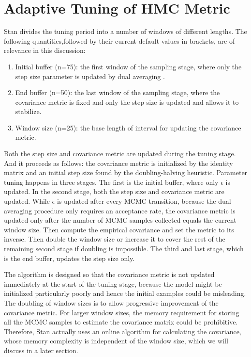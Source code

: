 \documentclass[12pt]{report}
\begin{document}
\section{Adaptive Tuning of HMC Metric}
Stan divides the tuning period into a number of windows of different lengths. The following quantities,followed by their current default values in brackets, are of relevance in this discussion: 

\begin{enumerate}
\item Initial buffer (n=75): the first window of the sampling stage, where only the step size parameter is updated by dual averaging .

\item End buffer (n=50): the last window of the sampling stage, where the covariance metric is fixed and only the step size is updated and allows it to stabilize.

\item Window size (n=25): the base length of interval for updating the covariance metric. 
\end{enumerate}

Both the step size and covariance metric are updated during the tuning stage. And it proceeds as follows: the covariance metric is initialized by the identity matrix and an initial step size found by the doubling-halving heuristic. Parameter tuning happens in three stages. The first is the initial buffer, where only $\epsilon $ is updated. In the second stage, both the step size and covariance metric are updated. While $\epsilon$ is updated after every MCMC transition, because the dual averaging procedure only requires an acceptance rate, the covariance metric is updated only after the number of MCMC samples collected equals the current window size. Then compute the empirical covariance and set the metric to its inverse. Then double the window size or increase it to cover the rest of the remaining second stage if doubling is impossible. The third and last stage, which is the end buffer, updates the step size only. 

The algorithm is designed so that the covariance metric is not updated immediately at the start of the tuning stage, because the model might be initialized particularly poorly and hence the initial examples could be misleading. The doubling of window sizes is to allow progressive improvement of the covariance metric. For larger window sizes, the memory requirement for storing all the MCMC samples to estimate the covariance matrix could be prohibitive. Therefore, Stan actually uses an online algorithm for calculating the covariance, whose memory complexity is independent of the window size, which we will discuss in a later section.
\end{document}
